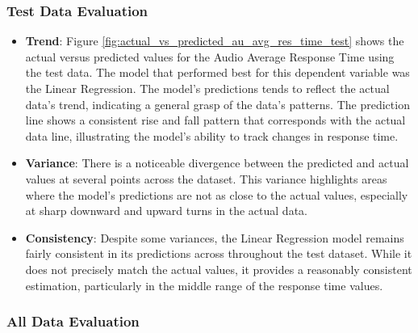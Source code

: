 \subsubsection*{Test Data Evaluation}

\begin{itemize}
    \item \textbf{Trend}: Figure \ref{fig:actual_vs_predicted_au_avg_res_time_test} shows the actual versus predicted values for the Audio Average Response Time using the test data. The model that performed
          best for this dependent variable was the Linear Regression. The model's predictions tends to reflect the actual data's trend, indicating a general grasp of the data's patterns. The prediction line shows
          a consistent rise and fall pattern that corresponds with the actual data line, illustrating the model's ability to track changes in response time.

    \item \textbf{Variance}: There is a noticeable divergence between the predicted and actual values at several points across the dataset. This variance highlights areas where the model's predictions are not
          as close to the actual values, especially at sharp downward and upward turns in the actual data.

    \item \textbf{Consistency}: Despite some variances, the Linear Regression model remains fairly consistent in its predictions across throughout the test dataset. While it does not precisely match the actual values, it provides
          a reasonably consistent estimation, particularly in the middle range of the response time values.

\end{itemize}


\subsubsection*{All Data Evaluation}

